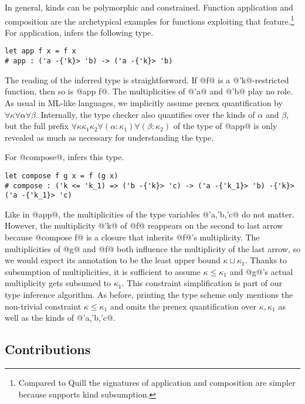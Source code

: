 In general, kinds can be polymorphic and constrained. Function
application and composition are the archetypical
examples for functions exploiting that feature.\footnote{Compared to
  Quill \cite{DBLP:conf/icfp/Morris16} the signatures of application and
  composition are simpler because \lang{} supports kind subsumption.}
For application, \lang{} infers the following type.
\begin{lstlisting}
let app f x = f x
# app : ('a -{'k}> 'b) -> ('a -{'k}> 'b)
\end{lstlisting}
The reading of the inferred type is straightforward. If
@f@ is a @'k@-restricted function, then so is
@app f@. The multiplicities of @'a@ and
@'b@ play no role. As usual in ML-like languages, we
implicitly assume prenex quantification by
$\forall\kappa\forall\alpha\forall\beta$. Internally, the
type checker also quantifies over the kinds of $\alpha$ and $\beta$,
but the full prefix
$\forall\kappa\kappa_1\kappa_2\forall(\alpha:\kappa_1)\forall(\beta:\kappa_2)$
of the type of @app@ is only revealed as much as necessary for
understanding the type.

For @compose@, \lang{} infers this type.
\begin{lstlisting}
let compose f g x = f (g x)
# compose : ('k <= 'k_1) => ('b -{'k}> 'c) -> ('a -{'k_1}> 'b) -{'k}> ('a -{'k_1}> 'c)
\end{lstlisting}
Like in @app@, the multiplicities of the type variables
@'a,'b,'c@ do not matter. However, the multiplicity
@'k@ of @f@ reappears on the second to last arrow
because @compose f@ is a closure that inherits
@f@'s multiplicity. The multiplicities of @g@  and
@f@ both influence the multiplicity of the last arrow, so
we would expect its annotation to be the least upper bound
$\kappa \sqcup \kappa_1$. Thanks to subsumption of multiplicities, it
is sufficient to assume $\kappa \le \kappa_1$ and @g@'s
actual multiplicity gets subsumed to $\kappa_1$. This constraint
simplification is part of our type inference algorithm. As before,
printing the type scheme only mentions the non-trivial constraint
$\kappa\le\kappa_1$ and omits the prenex quantification over $\kappa,
\kappa_1$ as well as the kinds of @'a,'b,'c@.

\lstDeleteShortInline@

\subsection{Contributions}
\label{sec:contributions}

